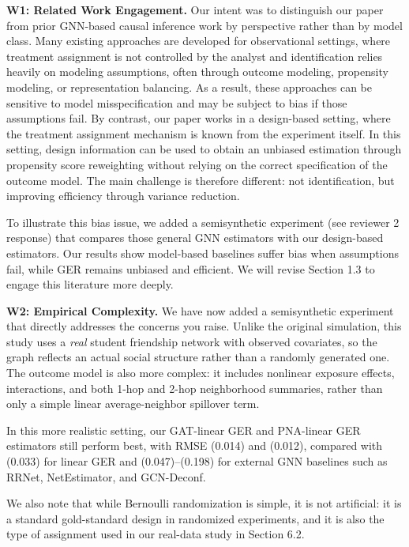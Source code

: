 \documentclass{article}
\theoremstyle{plain}
\theoremstyle{definition}
\theoremstyle{remark}
\begin{document}
\vspace{0.5em}
\noindent\textbf{W1: Related Work Engagement.}
Our intent was to distinguish our paper from prior GNN-based causal inference work by perspective rather than by model class. Many existing approaches are developed for observational settings, where treatment assignment is not controlled by the analyst and identification relies heavily on modeling assumptions, often through outcome modeling, propensity modeling, or representation balancing. As a result, these approaches can be sensitive to model misspecification and may be subject to bias if those assumptions fail. By contrast, our paper works in a design-based setting, where the treatment assignment mechanism is known from the experiment itself. In this setting, design information can be used to obtain an unbiased estimation through propensity score reweighting without relying on the correct specification of the outcome model. The main challenge is therefore different: not identification, but improving efficiency through variance reduction. 

To illustrate this bias issue, we added a semisynthetic experiment (see reviewer 2 response) that compares those general GNN estimators with our design-based estimators. Our results show model-based baselines suffer bias when assumptions fail, while GER remains unbiased and efficient. We will revise Section 1.3 to engage this literature more deeply.

\vspace{0.5em}
\noindent\textbf{W2: Empirical Complexity.}
We have now added a semisynthetic experiment that directly addresses the concerns you raise. Unlike the original simulation, this study uses a \emph{real} student friendship network with observed covariates, so the graph reflects an actual social structure rather than a randomly generated one. The outcome model is also more complex: it includes nonlinear exposure effects, interactions, and both 1-hop and 2-hop neighborhood summaries, rather than only a simple linear average-neighbor spillover term.

In this more realistic setting, our GAT-linear GER and PNA-linear GER estimators still perform best, with RMSE (0.014) and (0.012), compared with (0.033) for linear GER and (0.047)–(0.198) for external GNN baselines such as RRNet, NetEstimator, and GCN-Deconf.

We also note that while Bernoulli randomization is simple, it is not artificial: it is a standard gold-standard design in randomized experiments, and it is also the type of assignment used in our real-data study in Section 6.2.
\end{document}
